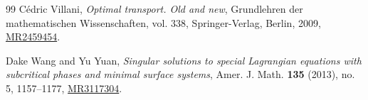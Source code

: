 \documentclass[12pt,letterpaper]{amsart}
\theoremstyle{definition}
\theoremstyle{plain}
\numberwithin{equation}{section}
\begin{document}
\begin{thebibliography}{99}
C\'edric Villani, \emph{Optimal transport. Old and new}, Grundlehren der
mathematischen Wissenschaften, vol. 338, Springer-Verlag, Berlin, 2009,
\href{https://mathscinet.ams.org/mathscinet-getitem?mr=2459454}{MR2459454}.

Dake Wang and Yu Yuan, \emph{Singular solutions to special Lagrangian
equations with subcritical phases and minimal surface systems}, Amer. J.
Math. \textbf{135} (2013), no. 5, 1157--1177,
\href{https://mathscinet.ams.org/mathscinet-getitem?mr=3117304}{MR3117304}.

\end{thebibliography}
\end{document}
